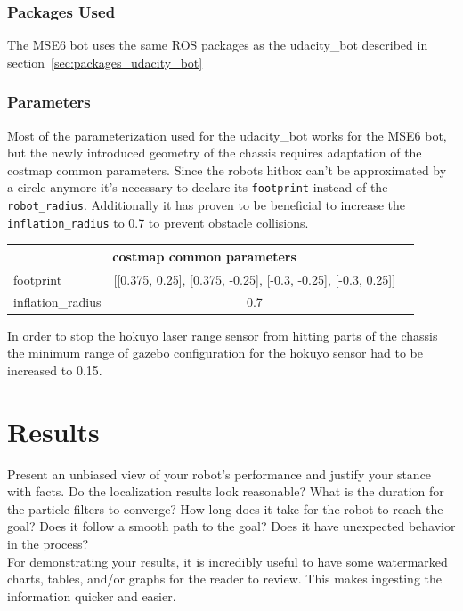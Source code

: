 \documentclass[10pt,journal,compsoc]{IEEEtran}
\begin{document}
\subsubsection{Packages Used}
The MSE6 bot uses the same ROS packages as the udacity\_bot described in section~\ref{sec:packages_udacity_bot}

\subsubsection{Parameters}
Most of the parameterization used for the udacity\_bot works for the MSE6 bot, but the newly introduced geometry of the chassis requires adaptation of the costmap common parameters.
Since the robots hitbox can't be approximated by a circle anymore it's necessary to declare its \texttt{footprint} instead of the \texttt{robot\_radius}.
Additionally it has proven to be beneficial to increase the \texttt{inflation\_radius} to 0.7 to prevent obstacle collisions.
\begin{table}[h]
      \begin{center}
            \begin{tabular}{|l|c|c|} 
      \multicolumn{2}{c}{costmap common parameters} \\ \hline
      footprint & [[0.375, 0.25], [0.375, -0.25], [-0.3, -0.25], [-0.3, 0.25]] \\ \hline
      inflation\_radius & 0.7 \\ \hline
\end{tabular}
\end{center}
\end{table}


In order to stop the hokuyo laser range sensor from hitting parts of the chassis the minimum range of gazebo configuration for the hokuyo sensor had to be increased to 0.15.

\section{Results}

Present an unbiased view of your robot's performance and justify your stance with facts. Do the localization results look reasonable? What is the duration for the particle filters to converge? How long does it take for the robot to reach the goal? Does it follow a smooth path to the goal? Does it have unexpected behavior in the process? \\
For demonstrating your results, it is incredibly useful to have some watermarked charts, tables, and/or graphs for the reader to review. This makes ingesting the information quicker and easier.
\end{document}
